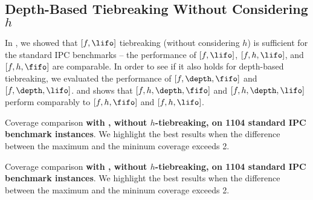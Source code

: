 

\subsection{Depth-Based Tiebreaking Without Considering $h$}

\label{sec:depth-noh}

In , we showed that $[f,\lifo]$ tiebreaking
(without considering $h$) is sufficient for the standard IPC benchmarks
-- the performance of $[f,\lifo]$, $[f,h,\lifo]$, and $[f,h,\fifo]$ are
comparable.  In order to see if it also holds for depth-based
tiebreaking, we evaluated the performance of $[f,\depth,\fifo]$
and $[f,\depth,\lifo]$.
 and 
 shows that
 $[f,h,\depth,\fifo]$ and  $[f,h,\depth,\lifo]$
 perform comparably to $[f,h,\fifo]$ and $[f,h,\lifo]$.


\begin{table}[htbp]
 {
 \centering
 \setlength{\tabcolsep}{0.1em}
 
 \caption{
 Coverage comparison \textbf{with \lmcut, without $h$-tiebreaking, on 1104 standard IPC benchmark instances}. We highlight the
 best results when the difference between the maximum and the mininum coverage exceeds 2.
 }
 \label{tbl:lmcut-ipc-noh}
 }
\end{table}
\begin{table}[htbp]
 {
 \centering
 \setlength{\tabcolsep}{0.1em}
 
 \caption{
 Coverage comparison \textbf{with \mands, without $h$-tiebreaking, on 1104 standard IPC benchmark instances}. We highlight the
 best results when the difference between the maximum and the mininum coverage exceeds 2.
 }
 \label{tbl:mands-ipc-noh}
 }
\end{table}

